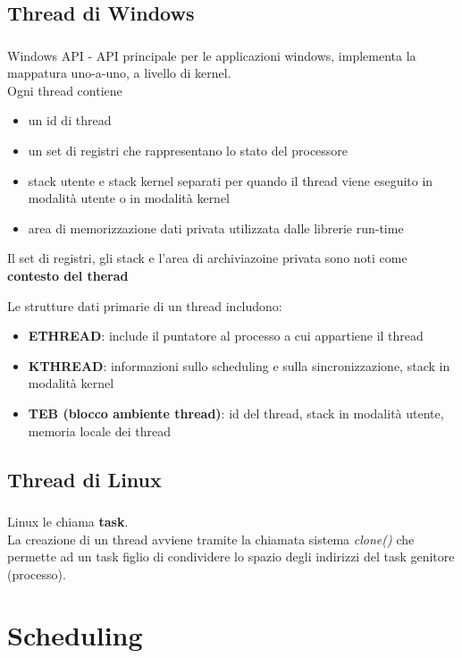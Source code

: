 \documentclass{beamer}
\newenvironment{mainframe}{
	\begin{frame}
		\frametitle{\insertsubsection}
		\framesubtitle{\insertsection}
	}{
	\end{frame}
}
\begin{document}
\subsection{Thread di Windows}
\begin{mainframe}
	Windows API - API principale per le applicazioni windows, implementa la mappatura uno-a-uno, a livello di kernel.\\
	Ogni thread contiene
	\begin{itemize}
		\item un id di thread
		\item un set di registri che rappresentano lo stato del processore
		\item stack utente e stack kernel separati per quando il thread viene eseguito in modalità utente o in modalità kernel
		\item area di memorizzazione dati privata utilizzata dalle librerie run-time
	\end{itemize}
	Il set di registri, gli stack e l'area di archiviazoine privata sono noti come \textbf{contesto del therad}
\end{mainframe}
\begin{frame}
	Le strutture dati primarie di un thread includono:
	\begin{itemize}
		\item \textbf{ETHREAD}: include il puntatore al processo a cui appartiene il thread
		\item \textbf{KTHREAD}: informazioni sullo scheduling e sulla sincronizzazione, stack in modalità kernel
		\item \textbf{TEB (blocco ambiente thread)}: id del thread, stack in modalità utente, memoria locale dei thread
	\end{itemize}
\end{frame}
\subsection{Thread di Linux}
\begin{mainframe}
	Linux le chiama \textbf{task}.\\
	La creazione di un thread avviene tramite la chiamata sistema \textit{clone()} che permette ad un task figlio di condividere lo spazio degli indirizzi del task genitore (processo).
\end{mainframe}
\section{Scheduling}
\end{document}
